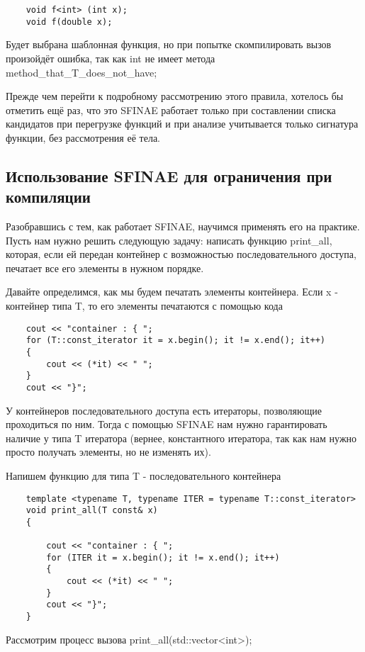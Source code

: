 	\begin{verbatim}
	void f<int> (int x);
	void f(double x);
	\end{verbatim}

	Будет выбрана шаблонная функция, но при попытке скомпилировать вызов произойдёт ошибка, так как int не имеет метода method\_that\_T\_does\_not\_have;

	Прежде чем перейти к подробному рассмотрению этого правила, хотелось бы отметить ещё раз, что это SFINAE работает только при составлении списка кандидатов при перегрузке функций и при анализе учитывается только сигнатура функции, без рассмотрения её тела.

\subsection{Использование SFINAE для ограничения при компиляции}

	Разобравшись с тем, как работает SFINAE, научимся применять его на практике. Пусть нам нужно решить следующую задачу: написать функцию print\_all, которая, если ей передан контейнер с возможностью последовательного доступа, печатает все его элементы в нужном порядке.
	
	Давайте определимся, как мы будем печатать элементы контейнера. Если x - контейнер типа T, то его элементы печатаются с помощью кода

	\begin{verbatim}
	cout << "container : { ";
	for (T::const_iterator it = x.begin(); it != x.end(); it++)
	{
	    cout << (*it) << " ";
	} 
	cout << "}";
	\end{verbatim}

	У контейнеров последовательного доступа есть итераторы, позволяющие проходиться по ним. Тогда с помощью SFINAE нам нужно гарантировать наличие у типа T итератора (вернее, константного итератора, так как нам нужно просто получать элементы, но не изменять их).
	
	Напишем функцию для типа T - последовательного контейнера

	\begin{verbatim}
	template <typename T, typename ITER = typename T::const_iterator>
	void print_all(T const& x)
	{

	    cout << "container : { ";
	    for (ITER it = x.begin(); it != x.end(); it++)
	    {
	        cout << (*it) << " ";
	    } 
	    cout << "}";
	}
	\end{verbatim}
	
	Рассмотрим процесс вызова print\_all(std::vector<int>);
	
